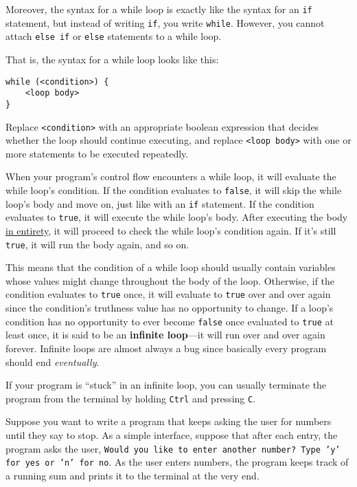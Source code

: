 \documentclass{article}
\newenvironment{tip}
    {\begin{tcolorbox}[title=Tip,colframe=white!70!blue,colback=white]}
    {\end{tcolorbox}}
\begin{document}
Moreover, the syntax for a while loop is exactly like the syntax for an \texttt{if} statement, but instead of writing \texttt{if}, you write \texttt{while}. However, you cannot attach \texttt{else if} or \texttt{else} statements to a while loop.

That is, the syntax for a while loop looks like this:

\begin{verbatim}
while (<condition>) {
    <loop body>
}
\end{verbatim}

Replace \texttt{<condition>} with an appropriate boolean expression that decides whether the loop should continue executing, and replace \texttt{<loop body>} with one or more statements to be executed repeatedly.

When your program's control flow encounters a while loop, it will evaluate the while loop's condition. If the condition evaluates to \texttt{false}, it will skip the while loop's body and move on, just like with an \texttt{if} statement. If the condition evaluates to \texttt{true}, it will execute the while loop's body. After executing the body \ul{in entirety}, it will proceed to check the while loop's condition again. If it's still \texttt{true}, it will run the body again, and so on.

This means that the condition of a while loop should usually contain variables whose values might change throughout the body of the loop. Otherwise, if the condition evaluates to \texttt{true} once, it will evaluate to \texttt{true} over and over again since the condition's truthness value has no opportunity to change. If a loop's condition has no opportunity to ever become \texttt{false} once evaluated to \texttt{true} at least once, it is said to be an \textbf{infinite loop}---it will run over and over again forever. Infinite loops are almost always a bug since basically every program should end \textit{eventually}.

\begin{tip}
    If your program is ``stuck'' in an infinite loop, you can usually terminate the program from the terminal by holding \texttt{Ctrl} and pressing \texttt{C}.
\end{tip}

Suppose you want to write a program that keeps asking the user for numbers until they say to stop. As a simple interface, suppose that after each entry, the program asks the user, \texttt{Would you like to enter another number? Type 'y' for yes or 'n' for no}. As the user enters numbers, the program keeps track of a running sum and prints it to the terminal at the very end.
\end{document}
